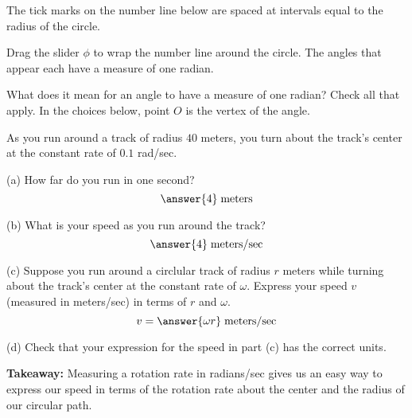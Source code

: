 \documentclass{ximera}
\begin{document}
\begin{exploration} \label{Esaghp:Cross}
The tick marks on the number line below are spaced at intervals equal to the radius of the circle.

Drag the slider $\phi$ to wrap the number line around the circle. The angles that appear each have a measure of one radian.

 
\begin{onlineOnly}
    \begin{center}
\end{center}
\end{onlineOnly}


\begin{question}   \label{Qsatd4th:Cross}
What does it mean for an angle to have a measure of one radian? Check all that apply. In the choices below, point $O$ is the vertex of the angle. 

\begin{selectAll}  
  \end{selectAll}  

\end{question}


\begin{question}  \label{Qt467743:Cross}
As you run around a track of radius $40$ meters, you turn about the track's center at the constant rate of $0.1$ rad/sec.

(a) How far do you run in one second?
\[
   \answer{4} \; \text{meters}
\]

(b) What is your speed as you run around the track?
\[
     \answer{4} \; \text{meters/sec} 
\]

(c) Suppose you run around a circlular track of radius $r$ meters while turning about the track's center at the constant rate of $\omega$. Express your speed $v$ (measured in meters/sec) in terms of $r$ and $\omega$.
\[
      v = \answer{\omega r} \; \text{meters/sec}
\]

(d) Check that your expression for the speed in part (c) has the correct units.


{\bf Takeaway:} Measuring a rotation rate in radians/sec gives us an easy way to express our speed in terms of the rotation rate about the center and the radius of our circular path.

\end{question}
\end{exploration}
\end{document}
